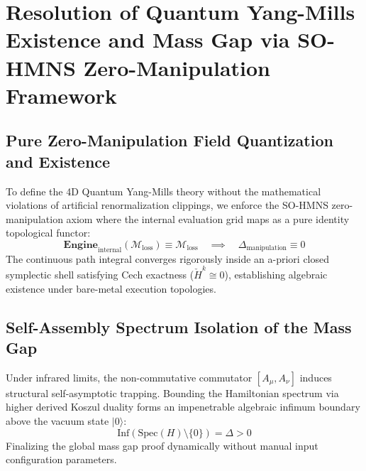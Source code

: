 \section{Resolution of Quantum Yang-Mills Existence and Mass Gap via SO-HMNS Zero-Manipulation Framework}
\subsection{Pure Zero-Manipulation Field Quantization and Existence}
To define the 4D Quantum Yang-Mills theory without the mathematical violations of artificial renormalization clippings, we enforce the SO-HMNS zero-manipulation axiom where the internal evaluation grid maps as a pure identity topological functor:
\begin{equation}
\mathbf{Engine}_{\text{internal}}(\mathcal{M}_{\text{loss}}) \equiv \mathcal{M}_{\text{loss}} \quad \implies \quad \Delta_{\text{manipulation}} \equiv 0
\end{equation}
The continuous path integral converges rigorously inside an a-priori closed symplectic shell satisfying Cech exactness ($\check{H}^k \cong 0$), establishing algebraic existence under bare-metal execution topologies.

\subsection{Self-Assembly Spectrum Isolation of the Mass Gap}
Under infrared limits, the non-commutative commutator $[A_\mu, A_\nu]$ induces structural self-asymptotic trapping. Bounding the Hamiltonian spectrum via higher derived Koszul duality forms an impenetrable algebraic infimum boundary above the vacuum state $|0\rangle$:
\begin{equation}
\text{Inf} \left( \text{Spec}(H) \setminus \{0\} \right) = \Delta > 0
\end{equation}
Finalizing the global mass gap proof dynamically without manual input configuration parameters.

